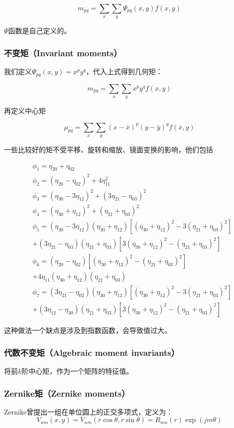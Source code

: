 \documentclass{ctexart}
\begin{document}
\[m_{pq}=\sum_x\sum_y\Psi_{pq}(x,y)f(x,y)\]

$\Psi$函数是自己定义的。
\subsubsection{不变矩（Invariant moments）}
我们定义$\Psi_{pq}(x,y)=x^py^q$，代入上式得到几何矩：

\[m_{pq}=\sum_x\sum_yx^py^qf(x,y)\]

再定义中心矩

\[\mu_{pq}=\sum_x\sum_y(x-\bar{x})^p(y-\bar{y})^qf(x,y)\]

一些比较好的矩不受平移、旋转和缩放、镜面变换的影响，他们包括

\begin{align*}
& \phi_1=\eta_{20}+\eta_{02} \\
& \phi_2=(\eta_{20}-\eta_{02})^2+4\eta_{11}^2 \\
& \phi_3=(\eta_{30}-3\eta_{12})^2+(3\eta_{21}-\eta_{03})^2 \\
& \phi_4=(\eta_{30}+\eta_{12})^2+(\eta_{21}+\eta_{03})^2 \\
& \phi_5=(\eta_{30}-3\eta_{12})(\eta_{30}+\eta_{12})[(\eta_{30}+\eta_{12})^2-3(\eta_{21}+\eta_{03})^2] \\
& +(3\eta_{21}-\eta_{03})(\eta_{21}+\eta_{03})[3(\eta_{30}+\eta_{12})^2-(\eta_{21}+\eta_{03})^2] \\
& \phi_6=(\eta_{20}-\eta_{02})[(\eta_{30}+\eta_{12})^2-(\eta_{21}+\eta_{03})^2] \\ 
& +4\eta_{11}(\eta_{30}+\eta_{12})(\eta_{21}+\eta_{03}) \\
& \phi_7=(3\eta_{21}-\eta_{02})(\eta_{30}+\eta_{12})[(\eta_{30}+\eta_{12})^2-3(\eta_{21}+\eta_{03})^2] \\
& +(3\eta_{12}-\eta_{30})(\eta_{21}+\eta_{03})[3(\eta_{30}+\eta_{12})^2-(\eta_{21}+\eta_{03})^2]
\end{align*}

这种做法一个缺点是涉及到指数函数，会导致值过大。
\subsubsection{代数不变矩（Algebraic moment invariants）}
将前$k$阶中心矩，作为一个矩阵的特征值。
\subsubsection{Zernike矩（Zernike moments）}
Zernike曾提出一组在单位圆上的正交多项式，定义为：
\[V_{nm}(x,y)=V_{nm}(r \cos \theta,r \sin \theta)=R_{nm}(r)\exp(jm\theta) \]
\end{document}
